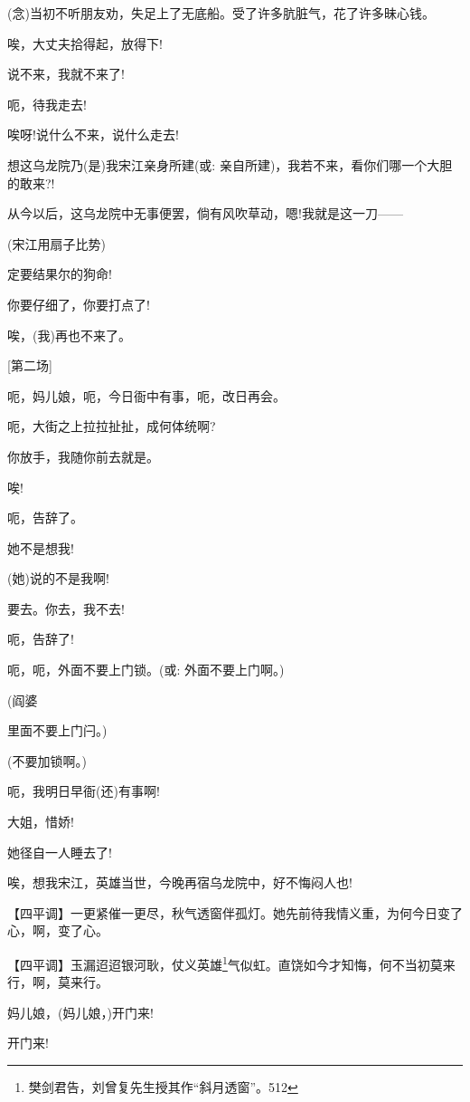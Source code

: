 {({\akai 念})当初不听朋友劝，失足上了无底船。受了许多肮脏气，花了许多昧心钱。}

{唉，大丈夫拾得起，放得下!}

{说不来，我就不来了!}

{呃，待我走去!}

{唉呀!说什么不来，说什么走去!}

{想这乌龙院乃(是)我宋江亲身所建}({\akai 或}: 亲自所建){，我若不来，看你们哪一个大胆的敢来?!}

{从今以后，这乌龙院中无事便罢，倘有风吹草动，嗯!我就是这一刀------}

{(宋江用扇子比势)}

{定要结果尔的狗命!}

{你要仔细了，你要打点了!}

{唉，(我)再也不来了。}

{{[}第二场{]}}

{呃，妈儿娘，呃，今日衙中有事，呃，改日再会。}

{呃，大街之上拉拉扯扯，成何体统啊?}

{你放手，我随你前去就是。}

{唉!}

{呃，告辞了。}

{她不是想我!}

{(她)说的不是我啊!}

{要去。你去，我不去!}

{呃，告辞了!}

{呃，呃，外面不要上门锁。({\akai 或}: 外面不要上门啊。)}

{(阎婆\hspace{30pt}~

里面不要上门闩。)}

{(不要加锁啊。)}

{呃，我明日早衙(还)有事啊!}

{大姐，惜娇!}

{她径自一人睡去了!}

{唉，想我宋江，英雄当世，今晚再宿乌龙院中，好不悔闷人也!}

\setlength{\hangindent}{60pt} {【四平调】一更紧催一更尽，秋气透窗伴孤灯。她先前待我情义重，为何今日变了心，啊，变了心。}

\setlength{\hangindent}{60pt} {【四平调】玉漏迢迢银河耿，仗义英雄}\footnote{ 樊剑君告，刘曾复先生授其作``斜月透窗''。{512}}{气似虹。直饶如今才知悔，何不当初莫来行，啊，莫来行。}

{妈儿娘，(妈儿娘，)开门来!}

{开门来!}

